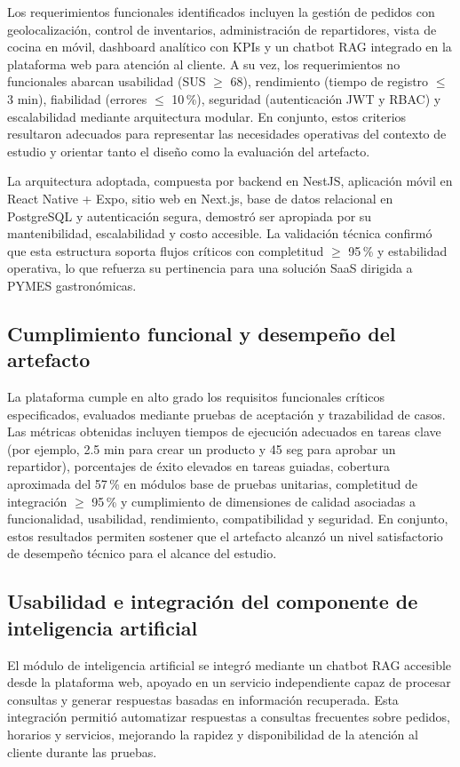 Los requerimientos funcionales identificados incluyen la gestión de pedidos con geolocalización, control de inventarios, administración de repartidores, vista de cocina en móvil, dashboard analítico con KPIs y un chatbot RAG integrado en la plataforma web para atención al cliente. A su vez, los requerimientos no funcionales abarcan usabilidad (SUS $\geq$ 68), rendimiento (tiempo de registro $\leq$ 3 min), fiabilidad (errores $\leq$ 10\,\%), seguridad (autenticación JWT y RBAC) y escalabilidad mediante arquitectura modular. En conjunto, estos criterios resultaron adecuados para representar las necesidades operativas del contexto de estudio y orientar tanto el diseño como la evaluación del artefacto.

La arquitectura adoptada, compuesta por backend en NestJS, aplicación móvil en React Native + Expo, sitio web en Next.js, base de datos relacional en PostgreSQL y autenticación segura, demostró ser apropiada por su mantenibilidad, escalabilidad y costo accesible. La validación técnica confirmó que esta estructura soporta flujos críticos con completitud $\geq$ 95\,\% y estabilidad operativa, lo que refuerza su pertinencia para una solución SaaS dirigida a PYMES gastronómicas.

\subsection{Cumplimiento funcional y desempeño del artefacto}

La plataforma cumple en alto grado los requisitos funcionales críticos especificados, evaluados mediante pruebas de aceptación y trazabilidad de casos. Las métricas obtenidas incluyen tiempos de ejecución adecuados en tareas clave (por ejemplo, 2.5 min para crear un producto y 45 seg para aprobar un repartidor), porcentajes de éxito elevados en tareas guiadas, cobertura aproximada del 57\,\% en módulos base de pruebas unitarias, completitud de integración $\geq$ 95\,\% y cumplimiento de dimensiones de calidad asociadas a funcionalidad, usabilidad, rendimiento, compatibilidad y seguridad. En conjunto, estos resultados permiten sostener que el artefacto alcanzó un nivel satisfactorio de desempeño técnico para el alcance del estudio.

\subsection{Usabilidad e integración del componente de inteligencia artificial}

El módulo de inteligencia artificial se integró mediante un chatbot RAG accesible desde la plataforma web, apoyado en un servicio independiente capaz de procesar consultas y generar respuestas basadas en información recuperada. Esta integración permitió automatizar respuestas a consultas frecuentes sobre pedidos, horarios y servicios, mejorando la rapidez y disponibilidad de la atención al cliente durante las pruebas.


